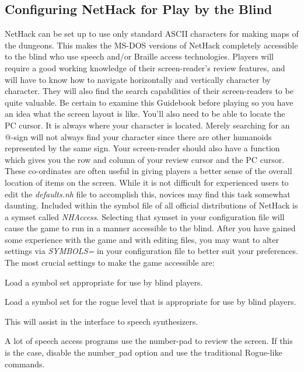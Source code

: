 \subsection*{Configuring NetHack for Play by the Blind}

NetHack can be set up to use only standard ASCII characters for making
maps of the dungeons. This makes the MS-DOS versions of NetHack completely
accessible to the blind who use speech and/or Braille access technologies.
Players will require a good working knowledge of their screen-reader's
review features, and will have to know how to navigate horizontally and
vertically character by character. They will also find the search
capabilities of their screen-readers to be quite valuable. Be certain to
examine this Guidebook before playing so you have an idea what the screen
layout is like. You'll also need to be able to locate the PC cursor. It is
always where your character is located. Merely searching for an @-sign will
not always find your character since there are other humanoids represented
by the same sign. Your screen-reader should also have a function which
gives you the row and column of your review cursor and the PC cursor.
These co-ordinates are often useful in giving players a better sense of the
overall location of items on the screen.
While it is not difficult for experienced users to edit the {\it defaults.nh\/}
file to accomplish this, novices may find this task somewhat daunting.
Included within the symbol file of all official distributions of NetHack 
is a symset called {\it NHAccess\/}.  Selecting that symset in your
configuration file will cause the game to run in a manner accessible 
to the blind. After you have gained some experience with the game 
and with editing files, you may want to alter settings via {\it SYMBOLS=\/} 
in your configuration file to better suit your preferences. 
The most crucial settings to make the game accessible are:
\blist{}
\item[\ib{symset:NHAccess}]
Load a symbol set appropriate for use by blind players.
\item[\ib{roguesymset:NHAccess}]
Load a symbol set for the rogue level that is appropriate for 
use by blind players.
\item[\ib{menustyle:traditional}]
This will assist in the interface to speech synthesizers.
\item[\ib{number\verb+_+pad}]
A lot of speech access programs use the number-pad to review the screen.
If this is the case, disable the number\verb+_+pad option and use the traditional
Rogue-like commands.
\elist

